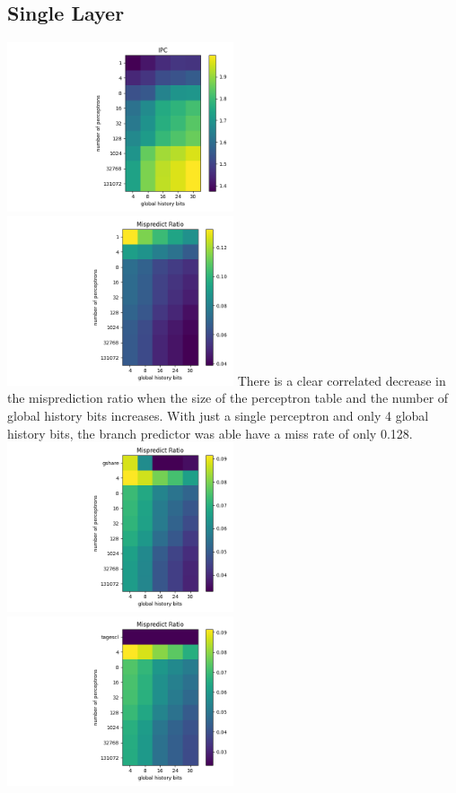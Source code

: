 \documentclass{article}
\begin{document}
\subsection*{Single Layer}
\includegraphics[width=0.5\textwidth]{./cse220data/data_1_layer/matrix_ipc_all.png}
\includegraphics[width=0.5\textwidth]{./cse220data/data_1_layer/matrix_mispred_all.png}
There is a clear correlated decrease in the misprediction ratio when the size of the perceptron table and the number of global history bits increases. With just a single perceptron and only 4 global history bits, the branch predictor was able have a miss rate of only 0.128.\\
\includegraphics[width=0.5\textwidth]{./cse220data/data_1_layer/matrix_mispred_gshare.png}
\includegraphics[width=0.5\textwidth]{./cse220data/data_1_layer/matrix_mispred_tagescl.png}
\end{document}
